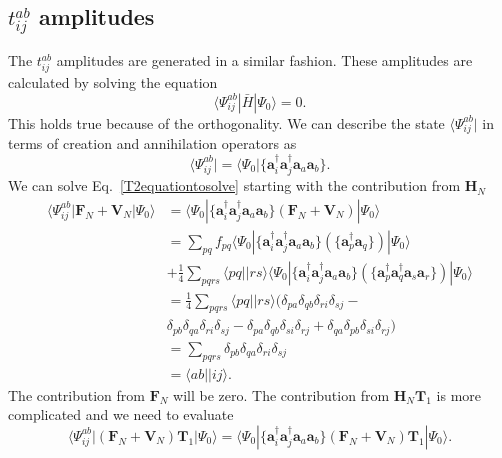 \documentclass[a4paper,norsk,11pt,twoside]{report}
\begin{document}
\subsection{$t_{ij}^{ab}$ amplitudes}
The $t_{ij}^{ab}$ amplitudes are generated in a similar fashion. These amplitudes are calculated by solving the equation
\begin{equation}
\langle \Psi_{ij}^{ab} | \bar{H} | \Psi_0 \rangle = 0 . \label{T2equationtosolve}
\end{equation}
This holds true because of the orthogonality. We can describe the
state $\langle \Psi_{ij}^{ab}|$ in terms of creation and annihilation
operators as
\begin{equation}
\langle \Psi_{ij}^{ab}| = \langle \Psi_0 | \{ \textbf{a}^{\dag}_i \textbf{a}^{\dag}_j \textbf{a}_a \textbf{a}_b \} .
\end{equation}
We can solve Eq.~\eqref{T2equationtosolve} starting with the contribution from $\textbf{H}_N$
\begin{align}
\langle \Psi_{ij}^{ab} | \textbf{F}_N + \textbf{V}_N | \Psi_0 \rangle & = 
\langle \Psi_{0} | \{\textbf{a}^{\dag}_i \textbf{a}^{\dag}_j \textbf{a}_a \textbf{a}_b\} \left( \textbf{F}_N + \textbf{V}_N \right) | \Psi_0 \rangle \nonumber \\ &
= \sum_{pq} f_{pq} \langle \Psi_{0} | \{\textbf{a}^{\dag}_i \textbf{a}^{\dag}_j \textbf{a}_a \textbf{a}_b\} \left( \{ \textbf{a}^{\dag}_p \textbf{a}_q \} \right) | \Psi_0 \rangle \nonumber \\ & 
+ \frac{1}{4} \sum_{pqrs} \langle pq || rs \rangle \langle \Psi_{0} | \{\textbf{a}^{\dag}_i \textbf{a}^{\dag}_j \textbf{a}_a \textbf{a}_b\} \left( \{ \textbf{a}^{\dag}_p \textbf{a}^{\dag}_q 
\textbf{a}_s \textbf{a}_r\} \right) | \Psi_0 \rangle \nonumber \\ &
= \frac{1}{4} \sum_{pqrs} \langle pq || rs \rangle
( \delta_{pa} \delta_{qb} \delta_{ri} \delta_{sj} - \nonumber \\ &
\delta_{pb} \delta_{qa} \delta_{ri} \delta_{sj} - 
\delta_{pa} \delta_{qb} \delta_{si} \delta_{rj} +
\delta_{qa} \delta_{pb} \delta_{si} \delta_{rj} ) \nonumber \\ &
= \sum_{pqrs} \delta_{pb} \delta_{qa} \delta_{ri} \delta_{sj} \nonumber \\ &
= \langle ab || ij \rangle .
\end{align}
The contribution from $\textbf{F}_N$ will be zero. The contribution from $\textbf{H}_N \textbf{T}_1$ is more complicated
and we need to evaluate
\begin{equation}
\langle \Psi_{ij}^{ab} | (\textbf{F}_N + \textbf{V}_N)\textbf{T}_1 | \Psi_0 \rangle = \langle \Psi_{0} | \{\textbf{a}^{\dag}_i \textbf{a}^{\dag}_j \textbf{a}_a \textbf{a}_b\} \left( \textbf{F}_N + \textbf{V}_N \right) \textbf{T}_1 | \Psi_0 \rangle .
\end{equation}
\end{document}
